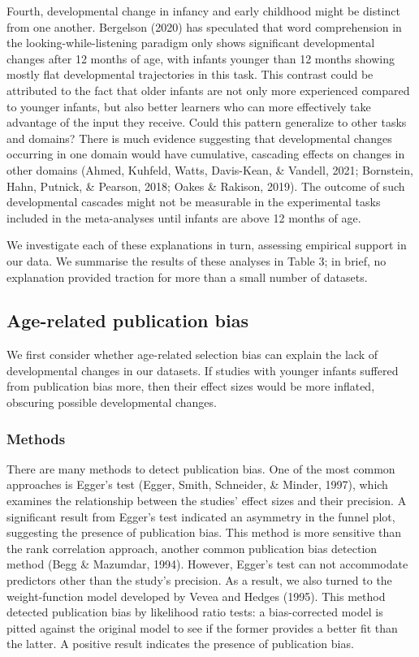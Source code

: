 \documentclass[
  man]{apa6}
\begin{document}
Fourth, developmental change in infancy and early childhood might be distinct from one another. Bergelson (2020) has speculated that word comprehension in the looking-while-listening paradigm only shows significant developmental changes after 12 months of age, with infants younger than 12 months showing mostly flat developmental trajectories in this task. This contrast could be attributed to the fact that older infants are not only more experienced compared to younger infants, but also better learners who can more effectively take advantage of the input they receive. Could this pattern generalize to other tasks and domains? There is much evidence suggesting that developmental changes occurring in one domain would have cumulative, cascading effects on changes in other domains (Ahmed, Kuhfeld, Watts, Davis-Kean, \& Vandell, 2021; Bornstein, Hahn, Putnick, \& Pearson, 2018; Oakes \& Rakison, 2019). The outcome of such developmental cascades might not be measurable in the experimental tasks included in the meta-analyses until infants are above 12 months of age.

We investigate each of these explanations in turn, assessing empirical support in our data. We summarise the results of these analyses in Table 3; in brief, no explanation provided traction for more than a small number of datasets.

\hypertarget{age-related-publication-bias}{%
\subsection{Age-related publication bias}\label{age-related-publication-bias}}

We first consider whether age-related selection bias can explain the lack of developmental changes in our datasets. If studies with younger infants suffered from publication bias more, then their effect sizes would be more inflated, obscuring possible developmental changes.

\hypertarget{methods-1}{%
\subsubsection{Methods}\label{methods-1}}

There are many methods to detect publication bias. One of the most common approaches is Egger's test (Egger, Smith, Schneider, \& Minder, 1997), which examines the relationship between the studies' effect sizes and their precision. A significant result from Egger's test indicated an asymmetry in the funnel plot, suggesting the presence of publication bias. This method is more sensitive than the rank correlation approach, another common publication bias detection method (Begg \& Mazumdar, 1994). However, Egger's test can not accommodate predictors other than the study's precision. As a result, we also turned to the weight-function model developed by Vevea and Hedges (1995). This method detected publication bias by likelihood ratio tests: a bias-corrected model is pitted against the original model to see if the former provides a better fit than the latter. A positive result indicates the presence of publication bias.
\end{document}
